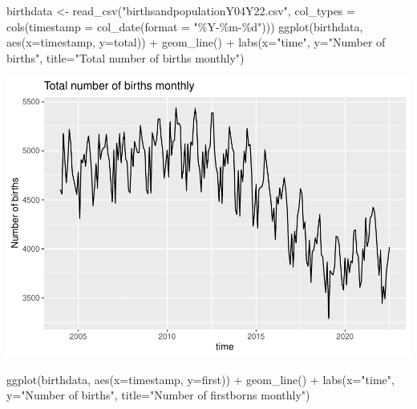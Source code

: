 \documentclass[
]{article}
\newenvironment{Shaded}{\begin{snugshade}}{\end{snugshade}}
\newcommand{\AttributeTok}[1]{\textcolor[rgb]{0.77,0.63,0.00}{#1}}
\newcommand{\FunctionTok}[1]{\textcolor[rgb]{0.00,0.00,0.00}{#1}}
\newcommand{\NormalTok}[1]{#1}
\newcommand{\OtherTok}[1]{\textcolor[rgb]{0.56,0.35,0.01}{#1}}
\newcommand{\SpecialCharTok}[1]{\textcolor[rgb]{0.00,0.00,0.00}{#1}}
\newcommand{\StringTok}[1]{\textcolor[rgb]{0.31,0.60,0.02}{#1}}
\begin{document}
\begin{Shaded}
\begin{Highlighting}[]
\NormalTok{birthdata }\OtherTok{\textless{}{-}} \FunctionTok{read\_csv}\NormalTok{(}\StringTok{"birthsandpopulationY04Y22.csv"}\NormalTok{,  }\AttributeTok{col\_types =} \FunctionTok{cols}\NormalTok{(}\AttributeTok{timestamp =} \FunctionTok{col\_date}\NormalTok{(}\AttributeTok{format =} \StringTok{"\%Y{-}\%m{-}\%d"}\NormalTok{)))}
\FunctionTok{ggplot}\NormalTok{(birthdata, }\FunctionTok{aes}\NormalTok{(}\AttributeTok{x=}\NormalTok{timestamp, }\AttributeTok{y=}\NormalTok{total)) }\SpecialCharTok{+} \FunctionTok{geom\_line}\NormalTok{() }\SpecialCharTok{+} \FunctionTok{labs}\NormalTok{(}\AttributeTok{x=}\StringTok{"time"}\NormalTok{, }\AttributeTok{y=}\StringTok{"Number of births"}\NormalTok{, }\AttributeTok{title=}\StringTok{"Total number of births monthly"}\NormalTok{) }
\end{Highlighting}
\end{Shaded}

\includegraphics{GoogleTrendsMarkdown_files/figure-latex/unnamed-chunk-2-1.pdf}

\begin{Shaded}
\begin{Highlighting}[]
\FunctionTok{ggplot}\NormalTok{(birthdata, }\FunctionTok{aes}\NormalTok{(}\AttributeTok{x=}\NormalTok{timestamp, }\AttributeTok{y=}\NormalTok{first)) }\SpecialCharTok{+} \FunctionTok{geom\_line}\NormalTok{() }\SpecialCharTok{+} \FunctionTok{labs}\NormalTok{(}\AttributeTok{x=}\StringTok{"time"}\NormalTok{, }\AttributeTok{y=}\StringTok{"Number of births"}\NormalTok{, }\AttributeTok{title=}\StringTok{"Number of firstborns monthly"}\NormalTok{) }
\end{Highlighting}
\end{Shaded}
\end{document}
